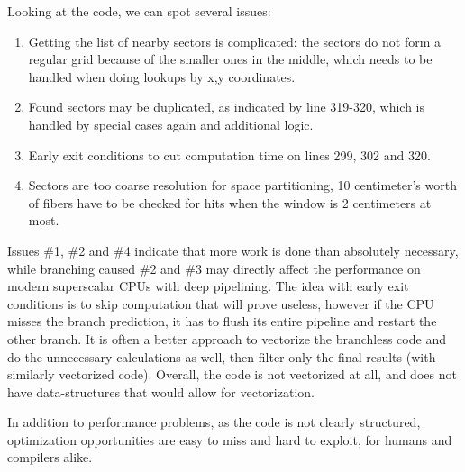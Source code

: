 \documentclass[12pt]{article}
\begin{document}
Looking at the code, we can spot several issues:
\begin{enumerate}
	\item Getting the list of nearby sectors is complicated: the sectors do not form a regular grid because of the smaller ones in the middle, which needs to be handled when doing lookups by x,y coordinates.
	\item Found sectors may be duplicated, as indicated by line 319-320, which is handled by special cases again and additional logic.
	\item Early exit conditions to cut computation time on lines 299, 302 and 320.
	\item Sectors are too coarse resolution for space partitioning, 10 centimeter's worth of fibers have to be checked for hits when the window is 2 centimeters at most.
\end{enumerate}

Issues \#1, \#2 and \#4 indicate that more work is done than absolutely necessary, while branching caused \#2 and \#3 may directly affect the performance on modern superscalar CPUs with deep pipelining. The idea with early exit conditions is to skip computation that will prove useless, however if the CPU misses the branch prediction, it has to flush its entire pipeline and restart the other branch. It is often a better approach to vectorize the branchless code and do the unnecessary calculations as well, then filter only the final results (with similarly vectorized code). Overall, the code is not vectorized at all, and does not have data-structures that would allow for vectorization.

In addition to performance problems, as the code is not clearly structured, optimization opportunities are easy to miss and hard to exploit, for humans and compilers alike.
\end{document}
